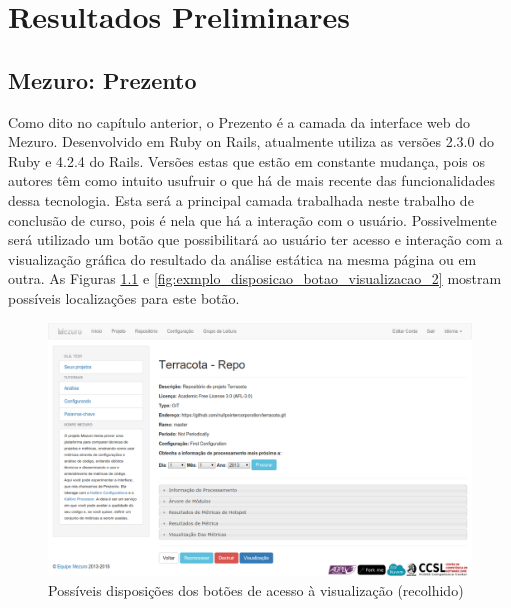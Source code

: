 \chapter{Resultados Preliminares}

\section{Mezuro: Prezento}

Como dito no capítulo anterior, o Prezento é a camada da interface web do
Mezuro. Desenvolvido em Ruby on Rails, atualmente utiliza as versões 2.3.0 do
Ruby e 4.2.4 do Rails. Versões estas que estão em constante mudança, pois os
autores têm como intuito usufruir o que há de mais recente das funcionalidades
dessa tecnologia. Esta será a principal camada trabalhada neste trabalho de
conclusão de curso, pois é
nela que há a interação com o usuário. Possivelmente será utilizado um botão que
possibilitará ao usuário ter acesso e interação com a visualização gráfica do
resultado da análise estática na mesma página ou em outra. As Figuras
\ref{fig:exmplo_disposicao_botao_visualizacao_1} e
\ref{fig:exmplo_disposicao_botao_visualizacao_2} mostram possíveis localizações
para este botão.


\begin{figure}[!htb]
	\centering
    \includegraphics[keepaspectratio=true,scale=0.33]
    {figuras/exmplo_disposicao_botao_visualizacao_1.eps}
  \caption{Possíveis disposições dos botões de acesso à visualização (recolhido)}
  \label{fig:exmplo_disposicao_botao_visualizacao_1}
\end{figure}

